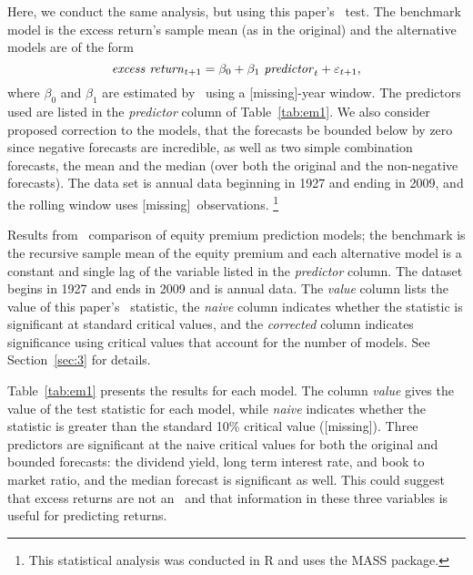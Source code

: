 \documentclass[12pt,fleqn]{article}
\providecommand\windowlength{[missing]}
\providecommand\empiricaltable{[missing]}
\providecommand\naivecriticalvalue{[missing]}
\begin{document}
Here, we conduct the same analysis, but using this paper's \mds\ test.
The benchmark model is the excess return's sample mean (as in the
original) and the alternative models are of the form
\begin{equation*}
  \mathit{excess~return}_{t+1} = \beta_{0} + \beta_{1}\
  \mathit{predictor}_{t} + \varepsilon_{t+1},
\end{equation*}
where $\beta_{0}$ and
$\beta_{1}$ are estimated by \ols\ using a \windowlength-year window.
The predictors used are listed in the \emph{predictor} column of
Table~\ref{tab:em1}. \citep[See][for a detailed description of the
variables.]{GoW:08}  We also consider \citepos{CaT:08} proposed
correction to the models, that the forecasts be bounded below by zero
since negative forecasts are incredible, as well as two simple
combination forecasts, the mean and the median (over both the original
and the non-negative forecasts).  The data set is annual data
beginning in 1927 and ending in 2009, and the rolling window uses
\windowlength\ observations.%
\footnote{This statistical analysis was conducted in R \citep{R} and
  uses the MASS \citep[7.3-22]{VeR:02} package.} %

\begin{table}[tb!]
  \centering
  \empiricaltable
\caption{Results from \oos\ comparison of equity premium prediction
  models; the benchmark is the recursive sample mean of the equity
  premium and each alternative model is a constant and single lag of
  the variable listed in the \emph{predictor} column.  The dataset begins
  in 1927 and ends in 2009 and is annual data. The \emph{value} column
  lists the value of this paper's \oos\ statistic, the \emph{naive}
  column indicates whether the statistic is significant at standard
  critical values, and the \emph{corrected} column indicates significance
  using critical values that
  account for the number of models.  See Section~\ref{sec:3} for details.}
\label{tab:em1}
\end{table}

Table~\ref{tab:em1} presents the results for each model.  The column
\emph{value} gives the value of the test statistic for each model,
while \emph{naive} indicates whether the statistic is greater than the
standard 10\% critical value (\naivecriticalvalue). Three predictors
are significant at the naive critical values for both the original and
bounded forecasts: the dividend yield, long term interest rate, and
book to market ratio, and the median forecast is significant as well.
This could suggest that excess returns are not an \mds\ and that
information in these three variables is useful for predicting returns.
\end{document}
